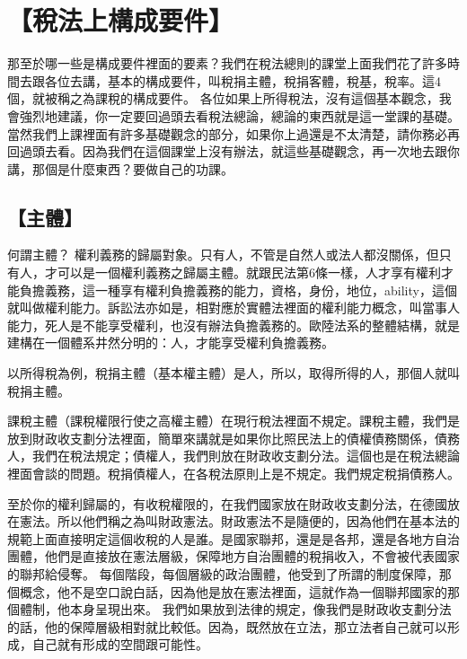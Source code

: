 \documentclass[]{ctexbook}
\begin{document}
\hypertarget{ux7a05ux6cd5ux4e0aux69cbux6210ux8981ux4ef6}{%
\section{【稅法上構成要件】}\label{ux7a05ux6cd5ux4e0aux69cbux6210ux8981ux4ef6}}

那至於哪一些是構成要件裡面的要素？我們在稅法總則的課堂上面我們花了許多時間去跟各位去講，基本的構成要件，叫稅捐主體，稅捐客體，稅基，稅率。這4個，就被稱之為課稅的構成要件。
各位如果上所得稅法，沒有這個基本觀念，我會強烈地建議，你一定要回過頭去看稅法總論，總論的東西就是這一堂課的基礎。當然我們上課裡面有許多基礎觀念的部分，如果你上過還是不太清楚，請你務必再回過頭去看。因為我們在這個課堂上沒有辦法，就這些基礎觀念，再一次地去跟你講，那個是什麼東西？要做自己的功課。

\hypertarget{ux4e3bux9ad4}{%
\subsection{【主體】}\label{ux4e3bux9ad4}}

何謂主體？ 權利義務的歸屬對象。只有人，不管是自然人或法人都沒關係，但只有人，才可以是一個權利義務之歸屬主體。就跟民法第6條一樣，人才享有權利才能負擔義務，這一種享有權利負擔義務的能力，資格，身份，地位，ability，這個就叫做權利能力。訴訟法亦如是，相對應於實體法裡面的權利能力概念，叫當事人能力，死人是不能享受權利，也沒有辦法負擔義務的。歐陸法系的整體結構，就是建構在一個體系井然分明的：人，才能享受權利負擔義務。

以所得稅為例，稅捐主體（基本權主體）是人，所以，取得所得的人，那個人就叫稅捐主體。

課稅主體（課稅權限行使之高權主體）在現行稅法裡面不規定。課稅主體，我們是放到財政收支劃分法裡面，簡單來講就是如果你比照民法上的債權債務關係，債務人，我們在稅法規定；債權人，我們則放在財政收支劃分法。這個也是在稅法總論裡面會談的問題。稅捐債權人，在各稅法原則上是不規定。我們規定稅捐債務人。

至於你的權利歸屬的，有收稅權限的，在我們國家放在財政收支劃分法，在德國放在憲法。所以他們稱之為叫財政憲法。財政憲法不是隨便的，因為他們在基本法的規範上面直接明定這個收稅的人是誰。是國家聯邦，還是是各邦，還是各地方自治團體，他們是直接放在憲法層級，保障地方自治團體的稅捐收入，不會被代表國家的聯邦給侵奪。
每個階段，每個層級的政治團體，他受到了所謂的制度保障，那個概念，他不是空口說白話，因為他是放在憲法裡面，這就作為一個聯邦國家的那個體制，他本身呈現出來。
我們如果放到法律的規定，像我們是財政收支劃分法的話，他的保障層級相對就比較低。因為，既然放在立法，那立法者自己就可以形成，自己就有形成的空間跟可能性。
\end{document}

